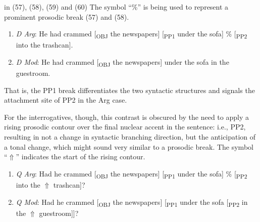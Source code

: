 \documentclass[12pt,oneside]{book}
\providecommand{\tightlist}{%
  \setlength{\itemsep}{0pt}\setlength{\parskip}{0pt}}
\begin{document}

 in (57), (58), (59) and (60)  The symbol ``\%'' is being used to represent a prominent prosodic break  (57) and (58).

\begin{enumerate}
\def\labelenumi{(\arabic{enumi})}
\setcounter{enumi}{56}
\tightlist
\item
  \emph{D Arg}: He had crammed {[}\textsubscript{OBJ} the newspapers{]} {[}\textsubscript{PP1} under the sofa{]} \% {[}\textsubscript{PP2} into the trashcan{]}.
\item
  \emph{D Mod}: He had crammed {[}\textsubscript{OBJ} the newspapers{]} under the sofa in the guestroom.
\end{enumerate}

 That is, the PP1 break differentiates the two syntactic structures and signals the attachment site of PP2 in the Arg case.

For the interrogatives, though, this contrast is obscured by the need to apply a rising prosodic contour over the final nuclear accent in the sentence: i.e., PP2, resulting in not a change in syntactic branching direction, but the anticipation of a tonal change, which might sound very similar to a prosodic break. The symbol ``\(\Uparrow\)'' indicates the start of the rising contour.

\begin{enumerate}
\def\labelenumi{(\arabic{enumi})}
\setcounter{enumi}{58}
\tightlist
\item
  \emph{Q Arg}: Had he crammed {[}\textsubscript{OBJ} the newspapers{]} {[}\textsubscript{PP1} under the sofa{]} \% {[}\textsubscript{PP2} into the \(\Uparrow\) trashcan{]}?
\item
  \emph{Q Mod}: Had he crammed {[}\textsubscript{OBJ} the newspapers{]} {[}\textsubscript{PP1} under the sofa {[}\textsubscript{PP2} in the \(\Uparrow\) guestroom{]}{]}?
\end{enumerate}
\end{document}
